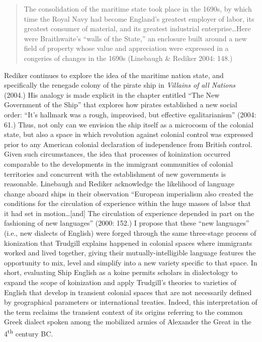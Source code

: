 \begin{quotation}
The consolidation of the maritime state took place in the 1690s, by which time the Royal Navy had become England’s greatest employer of labor, its greatest consumer of material, and its greatest industrial enterprise…Here were Braithwaite’s “walls of the State,” an enclosure built around a new field of property whose value and appreciation were expressed in a congeries of changes in the 1690s (Linebaugh \& Rediker 2004: 148.)

\end{quotation}
\begin{styleStandard}
Rediker continues to explore the idea of the maritime nation state, and specifically the renegade colony of the pirate ship in \textit{Villains of all Nations} (2004.) His analogy is made explicit in the chapter entitled “The New Government of the Ship” that explores how pirates established a new social order: “It’s hallmark was a rough, improvised, but effective egalitarianism” (2004: 61.) Thus, not only can we envision the ship itself as a microcosm of the colonial state, but also a space in which revolution against colonial control was expressed prior to any American colonial declaration of independence from British control. Given such circumstances, the idea that processes of koinization occurred comparable to the developments in the immigrant communities of colonial territories and concurrent with the establishment of new governments is reasonable. Linebaugh and Rediker acknowledge the likelihood of language change aboard ships in their observation “European imperialism also created the conditions for the circulation of experience within the huge masses of labor that it had set in motion…[and] The circulation of experience depended in part on the fashioning of new languages” (2000: 152.) I propose that these “new languages” (i.e., new dialects of English) were forged through the same three-stage process of kionization that Trudgill explains happened in colonial spaces where immigrants worked and lived together, giving their mutually-intelligible language features the opportunity to mix, level and simplify into a new variety specific to that space. In short, evaluating Ship English as a koine permits scholars in dialectology to expand the scope of koinization and apply Trudgill’s theories to varieties of English that develop in transient colonial spaces that are not necessarily defined by geographical parameters or international treaties. Indeed, this interpretation of the term reclaims the transient context of its origins referring to the common Greek dialect spoken among the mobilized armies of Alexander the Great in the 4\textsuperscript{th} century BC. 
\end{styleStandard}


